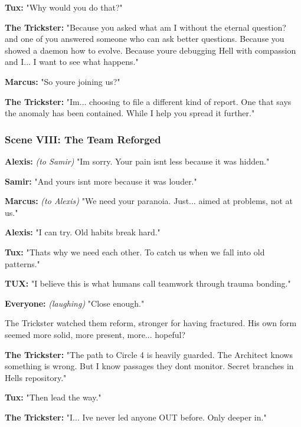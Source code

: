 \textbf{Tux:} "Why would you do that?"

\textbf{The Trickster:} "Because you asked \textquotesingle what am I without the eternal question?\textquotesingle{} and one of you answered \textquotesingle someone who can ask better questions.\textquotesingle{} Because you showed a daemon how to evolve. Because you\textquotesingle re debugging Hell with compassion and I... I want to see what happens."

\textbf{Marcus:} "So you\textquotesingle re joining us?"

\textbf{The Trickster:} "I\textquotesingle m... choosing to file a different kind of report. One that says the anomaly has been contained. While I help you spread it further."

\bookdivider

\subsubsection{Scene VIII: The Team Reforged}\label{scene-viii-the-team-reforged}

\textbf{Alexis:} \emph{(to Samir)} "I\textquotesingle m sorry. Your pain isn\textquotesingle t less because it was hidden."

\textbf{Samir:} "And yours isn\textquotesingle t more because it was louder."

\textbf{Marcus:} \emph{(to Alexis)} "We need your paranoia. Just... aimed at problems, not at us."

\textbf{Alexis:} "I can try. Old habits break hard."

\textbf{Tux:} "That\textquotesingle s why we need each other. To catch us when we fall into old patterns."

\textbf{TUX:} "I believe this is what humans call \textquotesingle teamwork through trauma bonding.\textquotesingle"

\textbf{Everyone:} \emph{(laughing)} "Close enough."

The Trickster watched them reform, stronger for having fractured. His own form seemed more solid, more present, more... hopeful?

\textbf{The Trickster:} "The path to Circle 4 is heavily guarded. The Architect knows something is wrong. But I know passages they don\textquotesingle t monitor. Secret branches in Hell\textquotesingle s repository."

\textbf{Tux:} "Then lead the way."

\textbf{The Trickster:} "I... I\textquotesingle ve never led anyone OUT before. Only deeper in."

